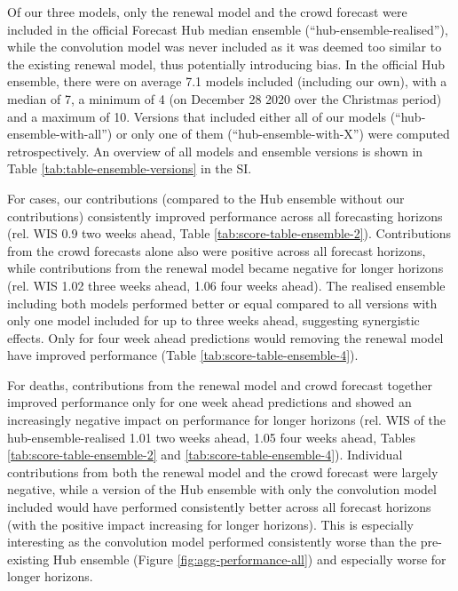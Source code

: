 \documentclass[
]{article}
\begin{document}
Of our three models, only the renewal model and the crowd forecast were included in the official Forecast Hub median ensemble (``hub-ensemble-realised''), while the convolution model was never included as it was deemed too similar to the existing renewal model, thus potentially introducing bias. In the official Hub ensemble, there were on average 7.1 models included (including our own), with a median of 7, a minimum of 4 (on December 28 2020 over the Christmas period) and a maximum of 10. Versions that included either all of our models (``hub-ensemble-with-all'') or only one of them (``hub-ensemble-with-X'') were computed retrospectively. An overview of all models and ensemble versions is shown in Table \ref{tab:table-ensemble-versions} in the SI.

For cases, our contributions (compared to the Hub ensemble without our contributions) consistently improved performance across all forecasting horizons (rel. WIS 0.9 two weeks ahead, Table \ref{tab:score-table-ensemble-2}). Contributions from the crowd forecasts alone also were positive across all forecast horizons, while contributions from the renewal model became negative for longer horizons (rel. WIS 1.02 three weeks ahead, 1.06 four weeks ahead). The realised ensemble including both models performed better or equal compared to all versions with only one model included for up to three weeks ahead, suggesting synergistic effects. Only for four week ahead predictions would removing the renewal model have improved performance (Table \ref{tab:score-table-ensemble-4}).

For deaths, contributions from the renewal model and crowd forecast together improved performance only for one week ahead predictions and showed an increasingly negative impact on performance for longer horizons (rel. WIS of the hub-ensemble-realised 1.01 two weeks ahead, 1.05 four weeks ahead, Tables \ref{tab:score-table-ensemble-2} and \ref{tab:score-table-ensemble-4}). Individual contributions from both the renewal model and the crowd forecast were largely negative, while a version of the Hub ensemble with only the convolution model included would have performed consistently better across all forecast horizons (with the positive impact increasing for longer horizons). This is especially interesting as the convolution model performed consistently worse than the pre-existing Hub ensemble (Figure \ref{fig:agg-performance-all}) and especially worse for longer horizons.
\end{document}
